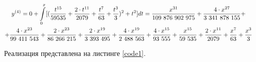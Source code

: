 \begin{multline}\label{formula11}
	\shoveright
	{
	\begin{gathered}
		y^{(4)} = 0 + \int\limits_0^x [(\frac{t^{15}}{59535} + \frac{2\cdot t^{11}}{2079} + \frac{t^7}{63} + \frac{t^3}{3})^2 + t^2]dt
		= \frac{x^{31}}{109 876 902 975} + \frac{4\cdot x^{27}}{3 341 878 155} + \\ + \frac{4\cdot x^{23}}{99 411 543} + \frac{2\cdot x^{23}}{86 266 215} + \frac{2\cdot x^{19}}{3 393 495} + \frac{4\cdot x^{19}}{2 488 563} + \frac{4\cdot x^{15}}{93 555} + \frac{x^{15}}{59 535} + \frac{2\cdot x^{11}}{2079} + \frac{x^7}{63} + \frac{x^3}{3}
	\end{gathered}
	}
\end{multline}

Реализация представлена на листинге \ref{code1}.\\









